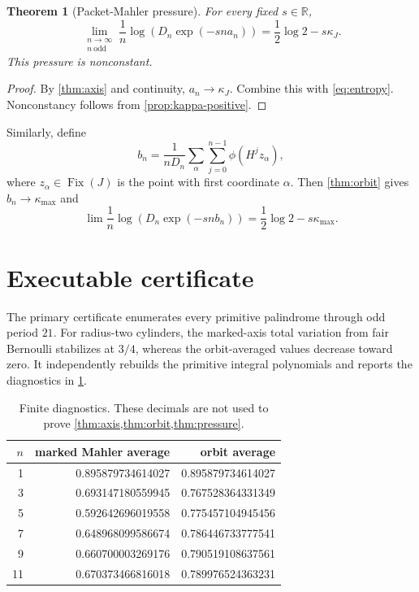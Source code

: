 \documentclass[11pt]{article}
\newtheorem{theorem}{Theorem}[section]
\theoremstyle{remark}
\newcommand{\R}{\mathbb R}
\begin{document}
\begin{theorem}[Packet-Mahler pressure]\label{thm:pressure}
For every fixed $s\in\R$,
\begin{equation}\label{eq:packet-pressure}
 \lim_{\substack{n\to\infty\\n\ \mathrm{odd}}}
 \frac1n\log\left(D_n\exp(-sn a_n)\right)
 =\frac12\log2-s\kappa_J.
\end{equation}
This pressure is nonconstant.
\end{theorem}

\begin{proof}
By \cref{thm:axis} and continuity, $a_n\to\kappa_J$.  Combine this with
\eqref{eq:entropy}.  Nonconstancy follows from
\cref{prop:kappa-positive}.
\end{proof}

Similarly, define
\begin{equation}\label{eq:bn}
 b_n=\frac1{nD_n}\sum_{\alpha}\sum_{j=0}^{n-1}
 \phi(H^jz_\alpha),
\end{equation}
where $z_\alpha\in\operatorname{Fix}(J)$ is the point with first coordinate
$\alpha$.  Then \cref{thm:orbit} gives $b_n\to\kappa_{\max}$ and
\begin{equation}\label{eq:orbit-pressure}
 \lim\frac1n\log\left(D_n\exp(-sn b_n)\right)
 =\frac12\log2-s\kappa_{\max}.
\end{equation}

\section{Executable certificate}

The primary certificate enumerates every primitive palindrome through odd
period $21$.  For radius-two cylinders, the marked-axis total variation
from fair Bernoulli stabilizes at $3/4$, whereas the orbit-averaged values
decrease toward zero.  It independently rebuilds the primitive integral
polynomials and reports the diagnostics in \cref{tab:numerics}.

\begin{table}[ht]
\centering
\caption{Finite diagnostics.  These decimals are not used to prove
\cref{thm:axis,thm:orbit,thm:pressure}.}
\label{tab:numerics}
\begin{tabular}{@{}rrr@{}}
\toprule
$n$ & marked Mahler average & orbit average\\
\midrule
1  & 0.895879734614027 & 0.895879734614027\\
3  & 0.693147180559945 & 0.767528364331349\\
5  & 0.592642696019558 & 0.775457104945456\\
7  & 0.648968099586674 & 0.786446733777541\\
9  & 0.660700003269176 & 0.790519108637561\\
11 & 0.670373466816018 & 0.789976524363231\\
\bottomrule
\end{tabular}
\end{table}
\end{document}
